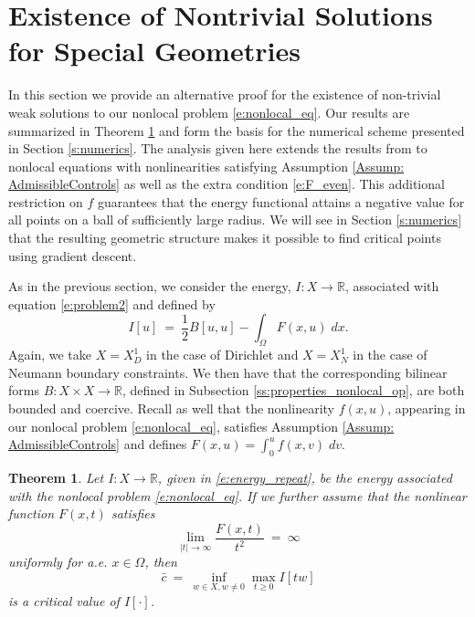 \documentclass[11pt]{amsart}   	%
\theoremstyle{plain}
\numberwithin{equation}{section}
\newtheorem{theorem}[thm]{Theorem}
\def\R{\mathbb{R}}
\begin{document}
\section{Existence of Nontrivial Solutions for Special Geometries}\label{Sec: Special}
In this section we provide an alternative proof for the existence of non-trivial weak solutions to our nonlocal problem \eqref{e:nonlocal_eq}. Our results are summarized in Theorem \ref{t:existence_2} and form the basis for the numerical scheme presented in Section \ref{s:numerics}. The analysis given here extends the results from \cite{bailova2021mountain} to nonlocal equations with nonlinearities satisfying Assumption \ref{Assump: AdmissibleControls} as well as the extra condition \eqref{e:F_even}. This additional restriction on $f$ guarantees that the energy functional attains a negative value for all points on a ball of sufficiently large radius. We will see in Section \ref{s:numerics} that the resulting geometric structure makes it possible to find critical points using gradient descent.


As in the previous section, we consider the energy, $I: X \longrightarrow \R$, associated with equation \eqref{e:problem2} and defined by
\begin{equation}\label{e:energy_repeat}
 I[u] \ = \ \frac{1}{2} B[u,u] - \int_\Omega F(x,u) \;dx.
 \end{equation}
Again, we take $X = X^1_D$ in the case of Dirichlet and $X = X^1_N$ in the case of Neumann boundary constraints.
We then have that  the corresponding bilinear forms $B:X \times X \longrightarrow \R$, defined in Subsection  \ref{ss:properties_nonlocal_op}, are both bounded and coercive. Recall as well that the nonlinearity $f(x,u)$, appearing in our nonlocal problem \eqref{e:nonlocal_eq}, satisfies Assumption \ref{Assump: AdmissibleControls} and defines $F(x,u) = \int_0^u f(x,v)\;dv$.

\begin{theorem}\label{t:existence_2}
Let $I: X \longrightarrow \R$, given in \eqref{e:energy_repeat}, be the energy associated with the nonlocal problem \eqref{e:nonlocal_eq}. If we further assume that the nonlinear function $F(x,t)$ satisfies
\begin{equation}\label{a:F}
 \lim_{|t| \to \infty} \frac{F(x,t)}{t^2} \ = \ \infty
 \end{equation}
uniformly for a.e. $ x\in \Omega$, then
\[ \bar{c} \ = \ \inf_{w \in X, w\neq 0} \max_{t\geq 0} I[tw]\]
is a critical value of $I[\cdot]$.
\end{theorem}
\end{document}
